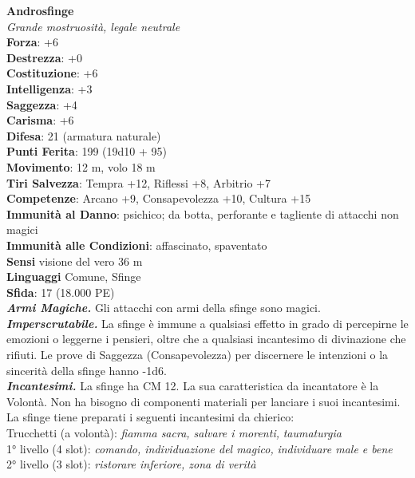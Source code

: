 \begin{multicols}{2}
\medskip\textbf{Androsfinge}\\
\emph{Grande mostruosità, legale neutrale}\\
\textbf{Forza}: +6\\
\textbf{Destrezza}: +0\\
\textbf{Costituzione}: +6\\
\textbf{Intelligenza}: +3\\
\textbf{Saggezza}: +4\\
\textbf{Carisma}: +6\\
\textbf{Difesa}: 21 (armatura naturale)\\
\textbf{Punti Ferita}: 199 (19d10 + 95)\\
\textbf{Movimento}: 12 m, volo 18 m\\
\textbf{Tiri Salvezza}: Tempra +12, Riflessi +8, Arbitrio +7\\
\textbf{Competenze}: Arcano +9, Consapevolezza +10, Cultura +15\\
\textbf{Immunità al Danno}: psichico; da botta, perforante e tagliente di attacchi non magici\\
\textbf{Immunità alle Condizioni}: affascinato, spaventato\\
\textbf{Sensi} visione del vero 36 m\\
\textbf{Linguaggi} Comune, Sfinge\\
\textbf{Sfida}: 17 (18.000 PE)\smallskip\\
\emph{\textbf{Armi Magiche.}} Gli attacchi con armi della sfinge sono magici.\\
\emph{\textbf{Imperscrutabile.}} La sfinge è immune a qualsiasi effetto in grado di percepirne le emozioni o leggerne i pensieri, oltre che a qualsiasi incantesimo di divinazione che rifiuti. Le prove di Saggezza (Consapevolezza) per discernere le intenzioni o la sincerità della sfinge hanno -1d6.\\
\emph{\textbf{Incantesimi.}} La sfinge ha CM 12. La sua caratteristica da incantatore è la Volontà. Non ha bisogno di componenti materiali per lanciare i suoi incantesimi. La sfinge tiene preparati i seguenti incantesimi da chierico:\\
Trucchetti (a volontà): \emph{fiamma sacra, salvare i morenti,} \emph{taumaturgia}\\
1° livello (4 slot): \emph{comando, individuazione del magico,} \emph{individuare male e bene}\\
2° livello (3 slot): \emph{ristorare inferiore, zona di verità}\\

\end{multicols}
